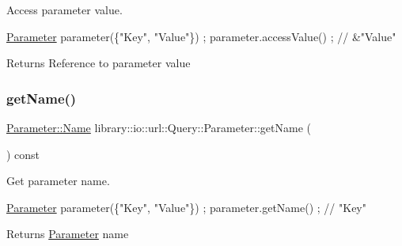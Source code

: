 Access parameter value. 


\begin{DoxyCode}
\hyperlink{classlibrary_1_1io_1_1url_1_1_query_1_1_parameter_ad6160646a07cb92213403426dbba4c64}{Parameter} parameter(\{\textcolor{stringliteral}{"Key"}, \textcolor{stringliteral}{"Value"}\}) ;
parameter.accessValue() ; \textcolor{comment}{// &"Value"}
\end{DoxyCode}


\begin{DoxyReturn}{Returns}
Reference to parameter value 
\end{DoxyReturn}
\mbox{\label{classlibrary_1_1io_1_1url_1_1_query_1_1_parameter_ad9aa95486e02d12654d69e6b877a1c57}} 
\subsubsection{\texorpdfstring{get\+Name()}{getName()}}
{\footnotesize\ttfamily \hyperlink{classlibrary_1_1io_1_1url_1_1_query_1_1_parameter_a7edf5fb8a4ae57aed1ce5dfa2405c981}{Parameter\+::\+Name} library\+::io\+::url\+::\+Query\+::\+Parameter\+::get\+Name (\begin{DoxyParamCaption}{ }\end{DoxyParamCaption}) const}



Get parameter name. 


\begin{DoxyCode}
\hyperlink{classlibrary_1_1io_1_1url_1_1_query_1_1_parameter_ad6160646a07cb92213403426dbba4c64}{Parameter} parameter(\{\textcolor{stringliteral}{"Key"}, \textcolor{stringliteral}{"Value"}\}) ;
parameter.getName() ; \textcolor{comment}{// "Key"}
\end{DoxyCode}


\begin{DoxyReturn}{Returns}
\hyperlink{classlibrary_1_1io_1_1url_1_1_query_1_1_parameter}{Parameter} name 
\end{DoxyReturn}
\mbox{\label{classlibrary_1_1io_1_1url_1_1_query_1_1_parameter_ad626a3718f1619b5d3d594f11fa57a52}} 
